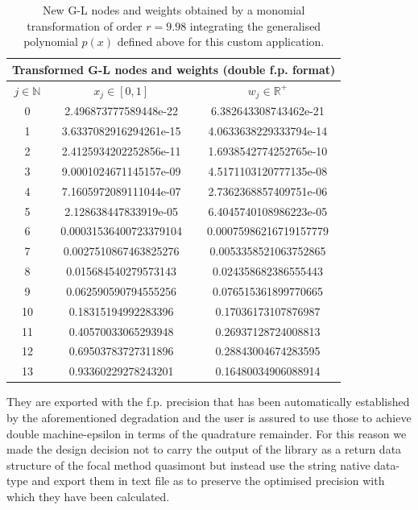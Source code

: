 \documentclass[a4paper, twosided]{book}
\begin{document}
\begin{table}[H]
\centering
\begin{tabular}{|c||c|c|}
\hline
\multicolumn{3}{|c|}{\textbf{Transformed G-L nodes and weights (double f.p. format)}} \\
\hline
$j\in\mathbb{N}$ & $x_j\in[0,1]$ & $w_j\in\mathbb{R}^+$ \\
\hline
0   &  2.496873777589448e-22    &  6.382643308743462e-21   \\
1   &  3.6337082916294261e-15   &  4.0633638229333794e-14  \\
2   &  2.4125934202252856e-11   &  1.6938542774252765e-10  \\
3   &  9.0001024671145157e-09   &  4.5171103120777135e-08  \\
4   &  7.1605972089111044e-07   &  2.7362368857409751e-06  \\
5   &  2.128638447833919e-05    &  6.4045740108986223e-05  \\
6   &  0.00031536400723379104   &  0.00075986216719157779  \\
7   &  0.0027510867463825276    &  0.0053358521063752865   \\
8   &  0.015684540279573143     &  0.024358682386555443    \\
9   &  0.062590590794555256     &  0.076515361899770665    \\
10  &  0.18315194992283396      &  0.17036173107876987     \\
11  &  0.40570033065293948      &  0.26937128724008813     \\
12  &  0.69503783727311896      &  0.28843004674283595     \\
13  &  0.93360229278243201      &  0.16480034906088914     \\
\hline
\end{tabular}
  \caption{New G-L nodes and weights obtained by a monomial transformation of order $r=9.98$ integrating the generalised polynomial $p(x)$ defined above for this custom application.}
  \label{table2.4}
\end{table}

\noindent
They are exported with the f.p. precision that has been automatically established by the aforementioned degradation and the user is assured to use those to achieve double machine-epsilon in terms of the quadrature remainder. For this reason we made the design decision not to carry the output of the library as a return data structure of the focal method \colorbox{poliGrayBlue}{quasimont} but instead use the \colorbox{poliGrayBlue}{string} native data-type and export them in text file as to preserve the optimised precision with which they have been calculated.
\end{document}
